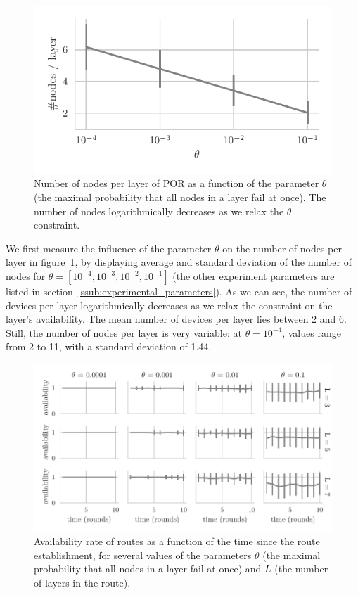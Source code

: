 \begin{figure}[t]
\centering
\includegraphics[width=0.8\columnwidth]{figures/nodes_per_layer_vs_theta.pdf}
\caption{\label{fig:nodes_per_layer_vs_theta}Number of nodes per layer of POR as a function of the parameter $\theta$ (the maximal probability that all nodes in a layer fail at once). The number of nodes logarithmically decreases as we relax the $\theta$ constraint.}
\end{figure}

We first measure the influence of the parameter $\theta$ on the number of nodes per layer in figure~\ref{fig:nodes_per_layer_vs_theta}, by displaying average and standard deviation of the number of nodes for $\theta=[10^{-4}, 10^{-3}, 10^{-2}, 10^{-1}]$ (the other experiment parameters are listed in section~\ref{ssub:experimental_parameters}).
As we can see, the number of devices per layer logarithmically decreases as we relax the constraint on the layer's availability.
The mean number of devices per layer lies between 2 and 6.
Still, the number of nodes per layer is very variable: at $\theta=10^{-4}$, values range from 2 to 11, with a standard deviation of 1.44. 

\begin{figure}[t]
\includegraphics[width=\columnwidth]{figures/success_rate_vs_t.pdf}
\caption{\label{fig:success_rate_vs_t}Availability rate of routes as a function of the time since the route establishment, for several values of the parameters $\theta$ (the maximal probability that all nodes in a layer fail at once) and $L$ (the number of layers in the route).}
\end{figure}

